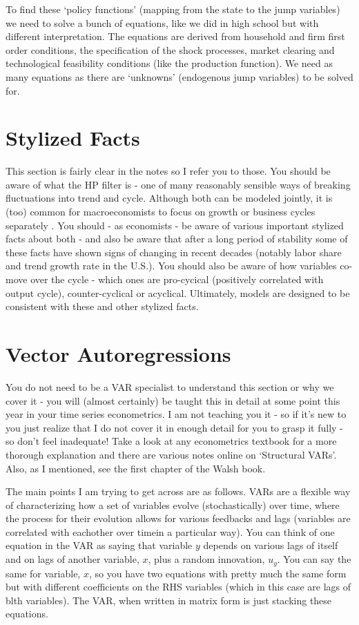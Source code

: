 \documentclass[authoryear,11pt]{elsarticle}
\begin{document}
To find these `policy functions' (mapping from the state to the jump variables) we need to solve a bunch of equations, like we did in high school but with different interpretation. The equations are derived from household and firm first order conditions, the specification of the shock processes, market clearing and technological feasibility conditions (like the production function). We need as many equations as there are `unknowns' (endogenous jump variables) to be solved for.

\section{Stylized Facts}
This section is fairly clear in the notes so I refer you to those. You should be aware of what the HP filter is - one of many reasonably sensible ways of breaking fluctuations into trend and cycle. Although both can be modeled jointly, it is (too) common for macroeconomists to focus on growth or business cycles separately . You should - as economists - be aware of various important stylized facts about both - and also be aware that after a long period of stability some of these facts have shown signs of changing in recent decades (notably labor share and trend growth rate in the U.S.). You should also be aware of how variables co-move over the cycle - which ones are pro-cycical (positively correlated with output cycle), counter-cyclical or acyclical. Ultimately, models are designed to be consistent with these and other stylized facts.

\section{Vector Autoregressions}
You do not need to be a VAR specialist to understand this section or why we cover it - you will (almost certainly) be taught this in detail at some point this year in your time series econometrics. I am not teaching you it - so if it's new to you just realize that I do not cover it in enough detail for you to grasp it fully - so don't feel inadequate! Take a look at any econometrics textbook for a more thorough explanation and there are various notes online on `Structural VARs'. Also, as I mentioned, see the first chapter of the Walsh book.

The main points I am trying to get across are as follows. VARs are a flexible way of characterizing how a set of variables evolve (stochastically) over time, where the process for their evolution allows for various feedbacks and lags (variables are correlated with eachother over timein a particular way). You can think of one equation in the VAR as saying that variable $y$ depends on various lags of itself and on lags of another variable, $x$, plus a random innovation, $u_{y}$. You can say the same for variable, $x$, so you have two equations with pretty much the same form but with different coefficients on the RHS variables (which in this case are lags of blth variables). The VAR, when written in matrix form is just stacking these equations.
\end{document}
